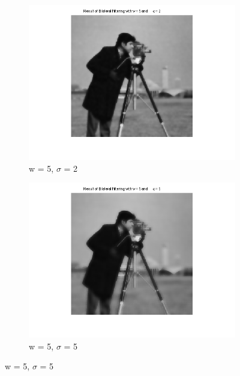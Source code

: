 \documentclass[12pt]{article}
\begin{document}
\begin{figure}[ht!]
        \centering
        
        \begin{subfigure}[b]{0.45\textwidth}
                \includegraphics[width=\textwidth]{w5s2.png}
                \caption{w = 5, $\sigma$ = 2}
        \end{subfigure}%
        \begin{subfigure}[b]{0.45\textwidth}
                \includegraphics[width=\textwidth]{w5s5.png}
                \caption{w = 5, $\sigma$ = 5}
        \end{subfigure}
        

\end{figure}
\end{document}
